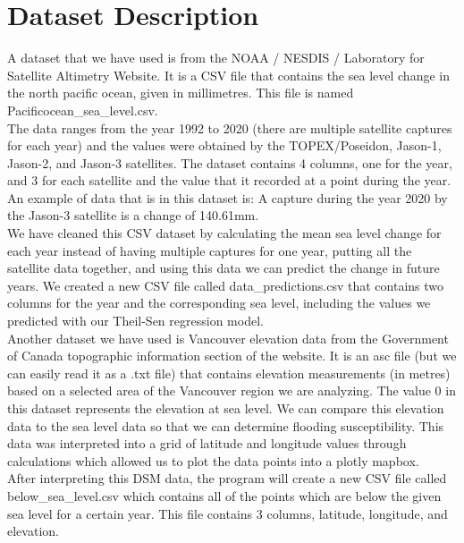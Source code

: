 \documentclass[fontsize=11pt]{article}
\begin{document}
\section*{Dataset Description}

\hspace{\parindent}A dataset that we have used is from the NOAA / NESDIS / Laboratory for Satellite Altimetry Website. It is a CSV file that contains the sea level change in the north pacific ocean, given in millimetres. This file is named Pacificocean\_sea\_level.csv. \\

The data ranges from the year 1992 to 2020  (there are multiple satellite captures for each year) and the values were obtained by the TOPEX/Poseidon, Jason-1, Jason-2, and Jason-3 satellites. The dataset contains 4 columns, one for the year, and 3 for each satellite and the value that it recorded at a point during the year. An example of data that is in this dataset is: A capture during the year 2020 by the Jason-3 satellite is a change of 140.61mm. \\

We have cleaned this CSV dataset by calculating the mean sea level change for each year instead of having multiple captures for one year, putting all the satellite data together, and using this data we can predict the change in future years. We created a new CSV file called data\_predictions.csv  that contains two columns for the year and the corresponding sea level, including the values we predicted with our Theil-Sen regression model.  \\

Another dataset we have used is Vancouver elevation data from the Government of Canada topographic information section of the website. It is an asc file (but we can easily read it as a .txt file) that contains elevation measurements (in metres) based on a selected area of the Vancouver region we are analyzing. The value 0 in this dataset represents the elevation at sea level. We can compare this elevation data to the sea level data so that we can determine flooding susceptibility. This data was interpreted into a grid of latitude and longitude values through calculations which allowed us to plot the data points into a plotly mapbox. \\

After interpreting this DSM data, the program will create a new CSV file called below\_sea\_level.csv which contains all of the points which are below the given sea level for a certain year. This file contains 3 columns, latitude, longitude, and elevation. \\
\end{document}
